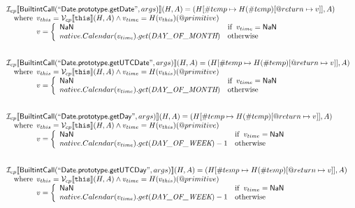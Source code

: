 \[
\begin{array}{l}
\mathcal{I} _{cp}\llbracket \mbox{\textsf{BuiltintCall}}(``\mbox{\textsf{Date.prototype.getDate}}",args)\rrbracket(H,A)
  = (H[\#temp \mapsto H(\#temp)[@return \mapsto v]], A)\\
\quad{\rm where}\begin{array}[t]{l}
  v_{this} = \mathcal{V} _{cp}\llbracket \mbox{\texttt{this}}\rrbracket (H,A) \land v_{time} = H(v_{this})(@primitive)\\
  v = \left\{\begin{array}{ll}
    \mbox{\textsf{NaN}}  & {\rm if}\begin{array}[t]{l}v_{time} = \mbox{\textsf{NaN}}\end{array}\\
    native.Calendar(v_{time}).get(\emph{DAY\_OF\_MONTH}) & {\rm otherwise}
    \end{array}\right.
  \end{array}\\
\\\\

\mathcal{I} _{cp}\llbracket \mbox{\textsf{BuiltintCall}}(``\mbox{\textsf{Date.prototype.getUTCDate}}",args)\rrbracket(H,A)
  = (H[\#temp \mapsto H(\#temp)[@return \mapsto v]], A)\\
\quad{\rm where}\begin{array}[t]{l}
  v_{this} = \mathcal{V} _{cp}\llbracket \mbox{\texttt{this}}\rrbracket (H,A) \land v_{time} = H(v_{this})(@primitive)\\
  v = \left\{\begin{array}{ll}
    \mbox{\textsf{NaN}}  & {\rm if}\begin{array}[t]{l}v_{time} = \mbox{\textsf{NaN}}\end{array}\\
    native.Calendar(v_{time}).get(\emph{DAY\_OF\_MONTH}) & {\rm otherwise}
    \end{array}\right.
  \end{array}\\
\\\\

\mathcal{I} _{cp}\llbracket \mbox{\textsf{BuiltintCall}}(``\mbox{\textsf{Date.prototype.getDay}}",args)\rrbracket(H,A)
  = (H[\#temp \mapsto H(\#temp)[@return \mapsto v]], A)\\
\quad{\rm where}\begin{array}[t]{l}
  v_{this} = \mathcal{V} _{cp}\llbracket \mbox{\texttt{this}}\rrbracket (H,A) \land v_{time} = H(v_{this})(@primitive)\\
  v = \left\{\begin{array}{ll}
    \mbox{\textsf{NaN}}  & {\rm if}\begin{array}[t]{l}v_{time} = \mbox{\textsf{NaN}}\end{array}\\
    native.Calendar(v_{time}).get(\emph{DAY\_OF\_WEEK}) -1 & {\rm otherwise}
    \end{array}\right.
  \end{array}\\
\\\\

\mathcal{I} _{cp}\llbracket \mbox{\textsf{BuiltintCall}}(``\mbox{\textsf{Date.prototype.getUTCDay}}",args)\rrbracket(H,A)
  = (H[\#temp \mapsto H(\#temp)[@return \mapsto v]], A)\\
\quad{\rm where}\begin{array}[t]{l}
  v_{this} = \mathcal{V} _{cp}\llbracket \mbox{\texttt{this}}\rrbracket (H,A) \land v_{time} = H(v_{this})(@primitive)\\
  v = \left\{\begin{array}{ll}
    \mbox{\textsf{NaN}}  & {\rm if}\begin{array}[t]{l}v_{time} = \mbox{\textsf{NaN}}\end{array}\\
    native.Calendar(v_{time}).get(\emph{DAY\_OF\_WEEK}) -1& {\rm otherwise}
    \end{array}\right.
  \end{array}\\
\\\\


\end{array}\]
